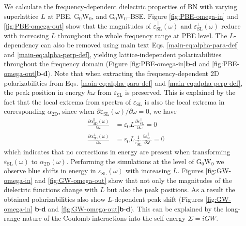 \documentclass[journal=ancac3,email=true,hyperref=true,keywords=false]{achemso}
\begin{document}
We calculate the frequency-dependent dielectric properties of BN with
varying superlattice $L$ at PBE, G$_{0}$W$_{0}$, and G$_{0}$W$_{0}$--BSE. 
Figure \ref{fig:PBE-omega-in} and \ref{fig:PBE-omega-out} show that the
magnitudes of $\varepsilon_{\mathrm{SL}}^{\parallel}(\omega)$ and
$\varepsilon_{\mathrm{SL}}^{\perp}(\omega)$ reduce with increasing $L$
throughout the whole frequency range at PBE level. The $L$-dependency can also be
removed using main text Eqs. \ref{main-eq:alpha-para-def} and
\ref{main-eq:alpha-perp-def}, yielding lattice-independent
polarizabilities throughout the frequency domain (Figure \ref{fig:PBE-omega-in}{\bf b}-{\bf d} and \ref{fig:PBE-omega-out}{\bf b}-{\bf d}). 
%
Note that when extracting the frequency-dependent 2D polarizabilities
from Eqs. \ref{main-eq:alpha-para-def} and
\ref{main-eq:alpha-perp-def}, the peak position in energy
$\hbar \omega$ from $\varepsilon_{\mathrm{SL}}$ is preserved. This is
explained by the fact that the local extrema from spectra of
$\varepsilon_{\mathrm{SL}}$ is also the local extrema in corresponding
$\alpha_{\mathrm{2D}}$, since when
$\partial \varepsilon_{\mathrm{SL}}(\omega) / \partial \omega = 0 $,
we have
\begin{subequations}
\begin{eqnarray}
  \label{eq:extrema-para}
  \frac{\partial \alpha_{\mathrm{2D}}^{\parallel}(\omega)}{\partial \omega}
  &= \varepsilon_{0}L {\displaystyle \frac{\partial \varepsilon_{\mathrm{SL}}^{\parallel}}{\partial \omega}} = 0   \\
  \label{eq:extrema-perp}
  \frac{\partial \alpha_{\mathrm{2D}}^{\perp}(\omega)}{\partial \omega}
  &= \varepsilon_{0}L {\displaystyle \frac{1}{\varepsilon_{\mathrm{SL}}^{2}}\frac{\partial \varepsilon_{\mathrm{SL}}^{\parallel}}{\partial \omega}} = 0
\end{eqnarray}
\end{subequations}
which indicates that no corrections in energy are present 
when transforming
$\varepsilon_{\mathrm{SL}}(\omega)$ to $\alpha_{\mathrm{2D}}(\omega)$.
Performing the simulations at the level of G$_{0}$W$_{0}$
we observe blue shifts in energy in $\varepsilon_{\mathrm{SL}}(\omega)$ 
with increasing $L$. Figures \ref{fig:GW-omega-in} and
\ref{fig:GW-omega-out} show that not only the magnitudes of the dielectric
functions change with $L$ but also the peak positions. As a result
the obtained polarizabilities also show $L$-dependent peak 
shift (Figures \ref{fig:GW-omega-in} {\bf b}-{\bf d} and
\ref{fig:GW-omega-out}{\bf b}-{\bf d}). This 
can be explained by the long-range nature of the 
Coulomb interactions into the self-energy 
$\Sigma=iGW$. 
\end{document}

